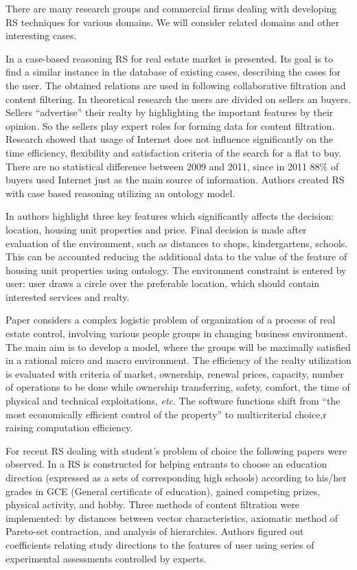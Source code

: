 \documentclass[conference]{IEEEtran}
\begin{document}
There are many research groups and commercial firms dealing with developing RS techniques for various domains.  We will consider related domains and other interesting cases.

In \cite{br22} a case-based reasoning RS for real estate market is presented.  Its goal is to find a similar instance in the database of existing cases, describing the cases for the user.  The obtained relations are used in following collaborative filtration and content filtering.  In theoretical research \cite{br20} the users are divided on sellers an buyers.  Sellers ``advertise'' their realty by highlighting the important features by their opinion.  So the sellers play expert roles for forming data for content filtration.  Research \cite{br23} showed that usage of Internet does not influence significantly on the time efficiency, flexibility and satisfaction criteria of the search for a flat to buy.  There are no statistical difference between 2009 and 2011, since in 2011 88\% of buyers used Internet just as the main source of information.  Authors created RS with case based reasoning utilizing an ontology model.

In \cite{br23} authors highlight three key features which significantly affects the decision: location, housing unit properties and price.  Final decision is made after evaluation of the environment, such as distances to shops, kindergartens, schools.  This can be accounted reducing the additional data to the value of the feature of housing unit properties using ontology.  The environment constraint is entered by user: user draws a circle over the preferable location, which should contain interested services and realty.

Paper \cite{br21} considers a complex logistic problem of organization of a process of real estate control, involving various people groups in changing business environment.  The main aim is to develop a model, where the groups will be maximally satisfied in a rational micro and macro environment.  The efficiency of the realty utilization is evaluated with criteria of market, ownership, renewal prices, capacity, number of operations to be done while ownership transferring, safety, comfort, the time of physical and technical exploitations, \emph{etc}.  The software functions shift from ``the most economically efficient control of the property'' to multicriterial choice,r raising computation efficiency.


For recent RS dealing with student's problem of choice the following papers were observed. In \cite{belotsky} a RS is constructed for helping entrants to choose an education direction (expressed as a sets of corresponding high schools) according to his/her grades in GCE (General certificate of education), gained competing prizes, physical activity, and hobby.  Three methods of content filtration were implemented: by distances between vector characteristics, axiomatic method of Pareto-set contraction, and analysis of hierarchies.  Authors figured out coefficients relating study directions to the features of user using series of experimental assessments controlled by experts.
\end{document}
